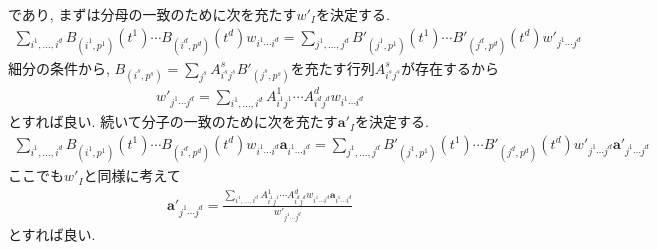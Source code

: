 \documentclass{jsarticle}
\theoremstyle{definition}%
\begin{document}
であり, まずは分母の一致のために次を充たす$w'_I$を決定する.
\begin{align}
{\sum\limits_{i^1,\dots,i^d}B_{(i^1,p^1)}(t^1)\cdots B_{(i^d,p^d)}(t^d)w_{i^1\cdots i^d}}
={\sum\limits_{j^1,\dots,j^d}B'_{(j^1,p^1)}(t^1)\cdots B'_{(j^d,p^d)}(t^d)w'_{j^1\cdots j^d}}
\end{align}
細分の条件から, $B_{(i^s,p^s)}=\sum_{j^s}A^s_{i^sj^s}B'_{(j^s,p^s)}$を充たす行列$A^s_{i^sj^s}$が存在するから
\begin{align}
    w'_{j^1\cdots j^d}
    =\sum_{i^1,\dots,i^d}A^1_{i^1j^1}\cdots A^d_{i^dj^d} w_{i^1\cdots i^d}
\end{align}
とすれば良い.
続いて分子の一致のために次を充たす$\bm{a}'_I$を決定する.
\begin{align}
    \sum_{i^1,\dots,i^d} B_{(i^1,p^1)}(t^1)\cdots B_{(i^d,p^d)}(t^d)w_{i^1\cdots i^d}\bm{a}_{i^1\cdots i^d}
    =\sum_{j^1,\dots,j^d} B'_{(j^1,p^1)}(t^1)\cdots B'_{(j^d,p^d)}(t^d)w'_{j^1\cdots j^d}\bm{a}'_{j^1\cdots j^d}
\end{align}
ここでも$w'_I$と同様に考えて
\begin{align}
    \bm{a}'_{j^1\cdots j^d}
    =\frac{\sum\limits_{i^1,\dots,i^d} A^1_{i^1j^1}\cdots A^d_{i^dj^d} w_{i^1\cdots i^d}\bm{a}_{i^1\cdots i^d}}{w'_{j^1\cdots j^d}}
\end{align}
とすれば良い.
\end{document}
